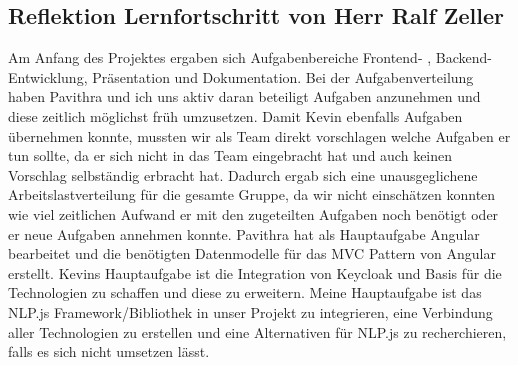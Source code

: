 \newpage
\subsection{Reflektion Lernfortschritt von Herr Ralf Zeller}

\noindent Am Anfang des Projektes ergaben sich Aufgabenbereiche Frontend- , Backend- Entwicklung, Präsentation und Dokumentation.
Bei der Aufgabenverteilung haben Pavithra und ich uns aktiv daran beteiligt Aufgaben anzunehmen und diese zeitlich möglichst früh umzusetzen.
Damit Kevin ebenfalls Aufgaben übernehmen konnte, mussten wir als Team direkt vorschlagen welche Aufgaben er tun sollte,
da er sich nicht in das Team eingebracht hat und auch keinen Vorschlag selbständig erbracht hat.
Dadurch ergab sich eine unausgeglichene Arbeitslastverteilung für die gesamte Gruppe,
da wir nicht einschätzen konnten wie viel zeitlichen Aufwand er mit den zugeteilten Aufgaben noch benötigt oder
er neue Aufgaben annehmen konnte.
Pavithra hat als Hauptaufgabe Angular bearbeitet und die benötigten Datenmodelle für das MVC Pattern von Angular erstellt.
Kevins Hauptaufgabe ist die Integration von Keycloak und Basis für die Technologien zu schaffen und diese zu erweitern.
Meine Hauptaufgabe ist das NLP.js Framework/Bibliothek in unser Projekt zu integrieren,
eine Verbindung aller Technologien zu erstellen und eine Alternativen für NLP.js zu recherchieren,
falls es sich nicht umsetzen lässt.

